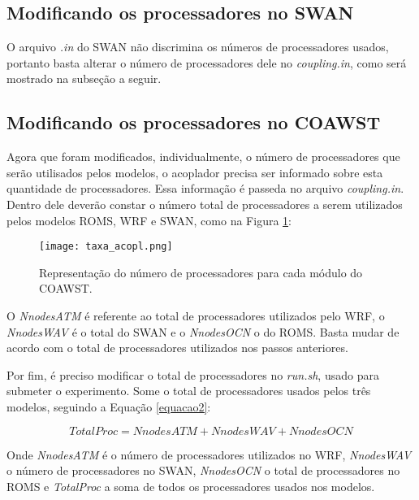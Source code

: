 \subsection{Modificando os processadores no SWAN}

\bigskip O arquivo \textit{.in} do SWAN não discrimina os números de processadores usados, portanto basta alterar o número de processadores dele no \textit{coupling.in}, como será mostrado na subseção a seguir.
\bigskip

\subsection{Modificando os processadores no COAWST}
\bigskip

\noindent Agora que foram modificados, individualmente, o número de processadores que serão utilisados pelos modelos, o acoplador precisa ser informado sobre esta quantidade de processadores. Essa informação é passeda no arquivo \textit{coupling.in}. Dentro dele deverão constar o número total de processadores a serem utilizados pelos modelos ROMS, WRF e SWAN, como na Figura \textcolor{bleu_cite}{\ref{procscoa}}:
\bigskip

\begin{figure}[H]
    \centering
    \texttt{[image: taxa\_acopl.png]}
    \caption{Representação do número de processadores para cada módulo do COAWST.}
    \label{procscoa}
\end{figure}
\bigskip

\noindent O \textit{NnodesATM} é referente ao total de processadores utilizados pelo WRF, o \textit{NnodesWAV} é o total do SWAN e o \textit{NnodesOCN} o do ROMS. Basta mudar de acordo com o total de processadores utilizados nos passos anteriores.
\bigskip

\noindent Por fim, é preciso modificar o total de processadores no \textit{run.sh}, usado para submeter o experimento. Some o total de processadores usados pelos três modelos, seguindo a Equação \textcolor{bleu_cite}{\ref{equacao2}}:
\bigskip

\begin{equation}
TotalProc = NnodesATM + NnodesWAV + NnodesOCN
\label{equacao2}
\end{equation}
\bigskip

\noindent Onde  \textit{NnodesATM} é o número de processadores utilizados no WRF, \textit{NnodesWAV} o número de processadores no SWAN, \textit{NnodesOCN} o total de processadores no ROMS e \textit{TotalProc} a soma de todos os processadores usados nos modelos.
\bigskip

